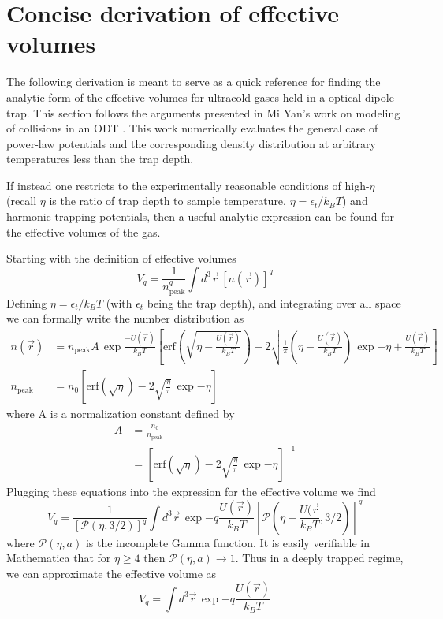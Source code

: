 \chapter{Concise derivation of effective volumes}
\label{app:effective_volumes}

The following derivation is meant to serve as a quick reference for finding the analytic form of the effective volumes for ultracold gases held in a optical dipole trap.
This section follows the arguments presented in Mi Yan's work on modeling of collisions in an ODT \cite{Yan2011}.
This work numerically evaluates the general case of power-law potentials and the corresponding density distribution at arbitrary temperatures less than the trap depth.

If instead one restricts to the experimentally reasonable conditions of high-$\eta$ (recall $\eta$ is the ratio of trap depth to sample temperature, $\eta=\epsilon_t/k_B T$) and harmonic trapping potentials, then a useful analytic expression can be found for the effective volumes of the gas.

Starting with the definition of effective volumes
\begin{equation}
	V_q = \frac{1}{n_\text{peak}^q} \int d^3\vec{r}\,[n(\vec{r})]^q
\end{equation}
Defining $\eta = \epsilon_t / k_B T$ (with $\epsilon_t$ being the trap depth), and integrating over all space we can formally write the number distribution as
\begin{align}
	n(\vec{r}) &= n_\text{peak} A \,\exp{\frac{-U(\vec{r})}{k_B T}} \left[ \text{erf}\left( \sqrt{\eta - \frac{U(\vec{r})}{k_B T}} \right) - 2 \sqrt{\frac{1}{\pi}\left( \eta - \frac{U(\vec{r})}{k_B T} \right)}\,\exp{-\eta +  \frac{U(\vec{r})}{k_B T}} \right] \\
	n_\text{peak} &= n_0 \left[ \text{erf}\left( \sqrt{\eta} \right) - 2 \sqrt{\frac{\eta}{\pi}}\,\exp{-\eta} \right]
\end{align}
where A is a normalization constant defined by
\begin{align*}
	A &= \frac{n_0}{n_\text{peak}} \\
   	  &= \left[ \text{erf}\left( \sqrt{\eta} \right) - 2 \sqrt{\frac{\eta}{\pi}}\,\exp{-\eta} \right]^{-1}
\end{align*}
Plugging these equations into the expression for the effective volume we find
\begin{equation}
	V_q = \frac{1}{[\mathcal{P}(\eta,3/2)]^q} \int d^3\vec{r}\, \exp{-q \frac{U(\vec{r})}{k_B T}} \left[ \mathcal{P}\left( \eta - \frac{U(\vec{r}}{k_B T}, 3/2 \right) \right]^q
\end{equation}
where $\mathcal{P}(\eta, a)$ is the incomplete Gamma function.
It is easily verifiable in Mathematica that for $\eta \geq 4$ then $\mathcal{P}(\eta,a)\rightarrow1$.
Thus in a deeply trapped regime, we can approximate the effective volume as
\begin{equation}
	V_q = \int d^3\vec{r} \,\exp{-q\frac{U(\vec{r})}{k_B T}}
\end{equation}


